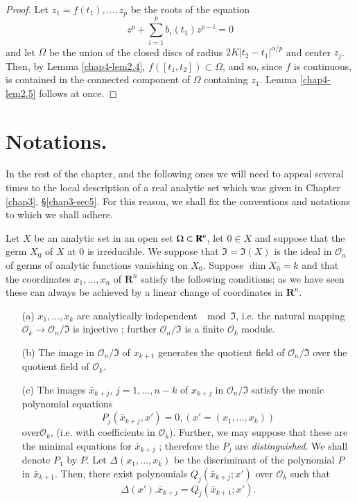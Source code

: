 \begin{proof}
Let $z_1 = f(t_1), \ldots, z_p$ be the roots of the equation 
$$
z^p + \sum\limits^p_{i=1} b_i (t_1) z^{p-i} =0
$$ 
and let $\Omega$ be the union of the closed discs of radius $2K |t_2 - t_1|^{\alpha/p}$ and center $z_j$. Then, by Lemma \ref{chap4-lem2.4}, $f([t_1, t_2]) \subset \Omega$, and so, since $f$ is continuous, is contained in the connected component of $\Omega$ containing $z_1$. Lemma \ref{chap4-lem2.5} follows at once.
\end{proof}

\section[Notations]{Notations.}\label{chap4-sec3} 

In the rest of the chapter, and the following ones we will need to appeal several times to the local description of a real analytic set which was given in Chapter \ref{chap3}, \S\ref{chap3-sec5}. For this reason, we shall fix the conventions and notations to which we shall adhere.

Let $X$ be an analytic set in an open set $\Omega \subset \mathbf{R}^n$, let $0 \in X$ and suppose that the germ $X_0$ of $X$ at 0 is irreducible. We suppose that $\mathfrak{I} = \mathfrak{I}(X)$ is the ideal in $\mathcal{O}_n$ of germs of analytic functions vanishing on $X_0$. Suppose $\dim X_0 =k$ and that the coordinates $x_1, \ldots, x_n$ of $\mathbf{R}^n$ satisfy the following conditions; as we have seen these can always be achieved by a linear change of coordinates in $\mathbf{R}^n$.
\begin{enumerate}
\item[(a)] $x_1, \ldots, x_k$ are analytically independent $\mod \mathfrak{I}$, i.e. the natural mapping $\mathcal{O}_k \to \mathcal{O}_n/\mathfrak{I}$ is injective ; further $\mathcal{O}_n/\mathfrak{I}$ is a finite $\mathcal{O}_k$ module.

\item[(b)] The image in $\mathcal{O}_n/\mathfrak{I}$ of $x_{k+1}$ generates the quotient field of $\mathcal{O}_n/\mathfrak{I}$ over the quotient field of $\mathcal{O}_k$.

\item[(c)] The images $\bar{x}_{k+j}$, $j=1, \ldots, n -k$ of $x_{k+j}$ in $\mathcal{O}_n/\mathfrak{I}$ satisfy the monic polynomial equations
  $$
P_j (\bar{x}_{k+j}, x') = 0, (x' = (x_1, \ldots, x_k))
$$
over\pageoriginale $\mathcal{O}_k$, (i.e. with coefficients in $\mathcal{O}_k$). Further, we may suppose that these are the minimal equations for $\bar{x}_{k+j}$ ; therefore the $P_j$ are \textit{distinguished}. We shall denote $P_1$ by $P$. Let $\Delta (x_1, \ldots, x_k)$ be the discriminant of the polynomial $P$ in $\bar{x}_{k+1}$. Then, there exist polynomials $Q_j (\bar{x}_{k+j} ; x')$ over $\mathcal{O}_k$ such that
$$
\Delta (x'). \bar{x}_{k+j} = Q_j (\bar{x}_{k+1} ; x').
$$
\end{enumerate}

